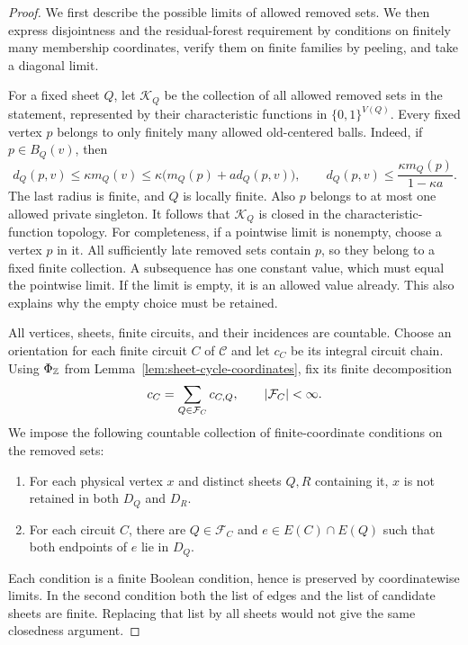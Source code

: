 \begin{proof}
We first describe the possible limits of allowed removed sets.  We then
express disjointness and the residual-forest requirement by conditions on
finitely many membership coordinates, verify them on finite families by
peeling, and take a diagonal limit.

For a fixed sheet $Q$, let $\mathcal K_Q$ be the collection of all
allowed removed sets in the statement, represented by their
characteristic functions in $\{0,1\}^{V(Q)}$.  Every fixed vertex $p$
belongs to only finitely many allowed old-centered balls.  Indeed, if
$p\in B_Q(v)$, then
\[
 d_Q(p,v)\leq\kappa m_Q(v)
 \leq\kappa\bigl(m_Q(p)+a d_Q(p,v)\bigr),
 \qquad
 d_Q(p,v)\leq\frac{\kappa m_Q(p)}{1-\kappa a}.
\]
The last radius is finite, and $Q$ is locally finite.  Also $p$
belongs to at most one allowed private singleton.  It follows that
$\mathcal K_Q$ is closed in the characteristic-function topology.
For completeness, if a pointwise limit is nonempty, choose a vertex
$p$ in it.  All sufficiently late removed sets contain $p$, so they
belong to a fixed finite collection.  A subsequence has one constant
value, which must equal the pointwise limit.  If the limit is empty,
it is an allowed value already.  This also explains why the empty
choice must be retained.

All vertices, sheets, finite circuits, and their incidences are
countable.  Choose an orientation for each finite circuit $C$ of
$\mathcal C$ and let $c_C$ be its integral circuit chain.  Using
$\Phi_{\mathbb Z}$ from Lemma~\ref{lem:sheet-cycle-coordinates}, fix its
finite decomposition
\begin{equation}
 c_C=\sum_{Q\in\mathcal F_C}c_{C,Q},
 \qquad \left\lvert\mathcal F_C\right\rvert<\infty.
 \label{eq:fixed-circuit-decomposition}
\end{equation}
We impose the following countable
collection of finite-coordinate conditions on the removed sets:
\begin{enumerate}
 \item For each physical vertex $x$ and distinct sheets $Q,R$ containing
 it, $x$ is not retained in both $D_Q$ and $D_R$.
 \item For each circuit $C$, there are $Q\in\mathcal F_C$ and
 $e\in E(C)\cap E(Q)$ such that both endpoints of $e$ lie in $D_Q$.
\end{enumerate}
Each condition is a finite Boolean condition, hence is preserved by
coordinatewise limits.  In the second condition both the list of
edges and the list of candidate sheets are finite.  Replacing that
list by all sheets would not give the same closedness argument.


\end{proof}
